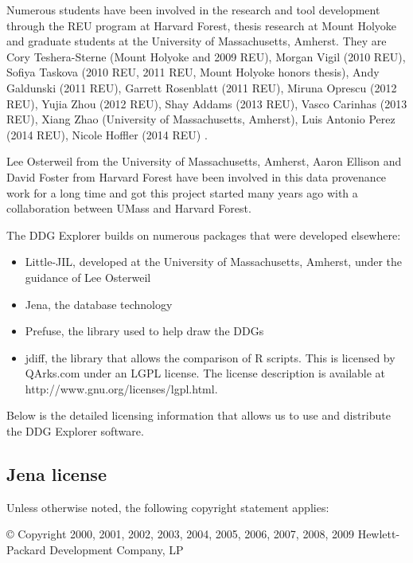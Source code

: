 \documentclass[12pt]{article}
\newcommand\liststyleWWviiiNumvii{%
\renewcommand\labelitemi{•}
\renewcommand\labelitemii{•}
\renewcommand\labelitemiii{•}
\renewcommand\labelitemiv{•}
}
\begin{document}
{{\mdseries\upshape\color{black}
Numerous students have been involved in the research and tool development through the REU program at Harvard Forest, thesis research at Mount Holyoke and graduate students at the University of Massachusetts, Amherst. They are Cory Teshera-Sterne (Mount Holyoke and 2009 REU), Morgan Vigil (2010 REU), Sofiya Taskova (2010 REU, 2011 REU, Mount Holyoke honors thesis), Andy Galdunski (2011 REU), Garrett Rosenblatt (2011 REU), Miruna Oprescu (2012 REU), Yujia Zhou (2012 REU), Shay Addams (2013 REU), Vasco Carinhas (2013 REU), Xiang Zhao (University of Massachusetts, Amherst), Luis Antonio Perez (2014 REU), Nicole Hoffler (2014 REU) .}

{\mdseries\upshape\color{black}
Lee Osterweil from the University of Massachusetts, Amherst, Aaron Ellison and David Foster from Harvard Forest have been involved in this data provenance work for a long time and got this project started many years ago with a collaboration between UMass and Harvard Forest.}

{\mdseries\upshape\color{black}
The DDG Explorer builds on numerous packages that were developed elsewhere:}

\liststyleWWviiiNumvii
\begin{itemize}
\item {\color{black}
Little-JIL, developed at the University of Massachusetts, Amherst, under the guidance of Lee Osterweil}
\item {\color{black}
Jena, the database technology}
\item {\color{black}
Prefuse, the library used to help draw the DDGs}
\item {\color{black}
jdiff, the library that allows the comparison of R scripts. This is licensed by QArks.com under an LGPL license. The license description is available at http://www.gnu.org/licenses/lgpl.html.}
\end{itemize}
{\mdseries\upshape\color{black}
Below is the detailed licensing information that allows us to use and distribute the DDG Explorer software.}

\subsection{Jena license}
{\mdseries\upshape\color{black}
Unless otherwise noted, the following copyright statement applies:}

{\mdseries\upshape\color{black}
© Copyright 2000, 2001, 2002, 2003, 2004, 2005, 2006, 2007, 2008, 2009 Hewlett-Packard Development Company, LP}

}
\end{document}
